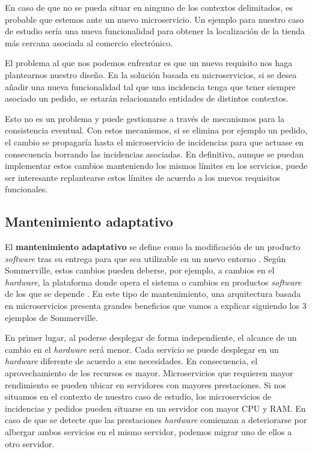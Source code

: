 \documentclass[11pt,spanish,listoffigures]{tfgetsinf}
\begin{document}
En caso de que no se pueda situar en ninguno de los contextos delimitados, es probable que estemos ante un nuevo microservicio. Un ejemplo para nuestro caso de estudio sería una nueva funcionalidad para obtener la localización de la tienda más cercana asociada al comercio electrónico.

El problema al que nos podemos enfrentar es que un nuevo requisito nos haga plantearnos nuestro diseño. En la solución basada en microservicios, si se desea añadir una nueva funcionalidad tal que una incidencia tenga que tener siempre asociado un pedido, se estarán relacionando entidades de distintos contextos. 

Esto no es un problema y puede gestionarse a través de mecanismos para la consistencia eventual. Con estos mecanismos, si se elimina por ejemplo un pedido, el cambio se propagaría hasta el microservicio de incidencias para que actuase en consecuencia borrando las incidencias asociadas. En definitiva, aunque se puedan implementar estos cambios manteniendo los mismos límites en los servicios, puede ser interesante replantearse estos límites de acuerdo a los nuevos requisitos funcionales.

\subsection{Mantenimiento adaptativo}

El \textbf{mantenimiento adaptativo} se define como la modificación de un producto \textit{software} tras su entrega para que sea utilizable en un nuevo entorno \cite{Bourque2014}. Según Sommerville, estos cambios pueden deberse, por ejemplo, a cambios en el \textit{hardware}, la plataforma donde opera el sistema o cambios en productos \textit{software} de los que se depende \cite{Sommerville2010}. En este tipo de mantenimiento, una arquitectura basada en microservicios presenta grandes beneficios que vamos a explicar siguiendo los 3 ejemplos de Sommerville.

En primer lugar, al poderse desplegar de forma independiente, el alcance de un cambio en el \textit{hardware} será menor. Cada servicio se puede desplegar en un \textit{hardware} diferente de acuerdo a sus necesidades. En consecuencia, el aprovechamiento de los recursos es mayor. Microservicios que requieren mayor rendimiento se pueden ubicar en servidores con mayores prestaciones. Si nos situamos en el contexto de nuestro caso de estudio, los microservicios de incidencias y pedidos pueden situarse en un servidor con mayor CPU y RAM. En caso de que se detecte que las prestaciones \textit{hardware} comienzan a deteriorarse por albergar ambos servicios en el mismo servidor, podemos migrar uno de ellos a otro servidor. 
\end{document}
